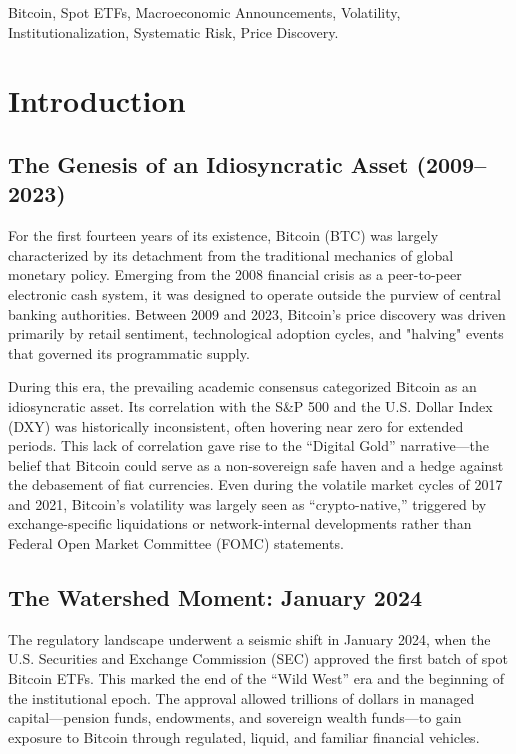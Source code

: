 \documentclass[10pt, conference, compsocconf]{IEEEtran}
\begin{document}
\begin{IEEEkeywords}
Bitcoin, Spot ETFs, Macroeconomic Announcements, Volatility, Institutionalization, Systematic Risk, Price Discovery.
\end{IEEEkeywords}


\section{Introduction}

\subsection{The Genesis of an Idiosyncratic Asset (2009--2023)}
For the first fourteen years of its existence, Bitcoin (BTC) was largely characterized by its detachment from the traditional mechanics of global monetary policy. Emerging from the 2008 financial crisis as a peer-to-peer electronic cash system, it was designed to operate outside the purview of central banking authorities. Between 2009 and 2023, Bitcoin’s price discovery was driven primarily by retail sentiment, technological adoption cycles, and "halving" events that governed its programmatic supply.

During this era, the prevailing academic consensus categorized Bitcoin as an idiosyncratic asset. Its correlation with the S\&P 500 and the U.S. Dollar Index (DXY) was historically inconsistent, often hovering near zero for extended periods. This lack of correlation gave rise to the ``Digital Gold'' narrative—the belief that Bitcoin could serve as a non-sovereign safe haven and a hedge against the debasement of fiat currencies. Even during the volatile market cycles of 2017 and 2021, Bitcoin’s volatility was largely seen as ``crypto-native,'' triggered by exchange-specific liquidations or network-internal developments rather than Federal Open Market Committee (FOMC) statements.

\subsection{The Watershed Moment: January 2024}
The regulatory landscape underwent a seismic shift in January 2024, when the U.S. Securities and Exchange Commission (SEC) approved the first batch of spot Bitcoin ETFs. This marked the end of the ``Wild West'' era and the beginning of the institutional epoch. The approval allowed trillions of dollars in managed capital—pension funds, endowments, and sovereign wealth funds—to gain exposure to Bitcoin through regulated, liquid, and familiar financial vehicles.
\end{document}
